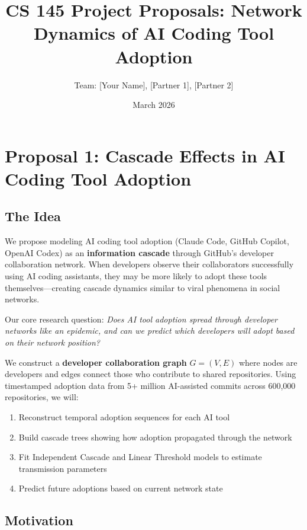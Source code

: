 \documentclass[11pt,letterpaper]{article}
\title{\vspace{-2em}\textbf{CS 145 Project Proposals: Network Dynamics of AI Coding Tool Adoption}\vspace{-1em}}
\author{Team: [Your Name], [Partner 1], [Partner 2]}
\date{March 2026}
\begin{document}
\maketitle
\thispagestyle{empty}

\section*{Proposal 1: Cascade Effects in AI Coding Tool Adoption}

\subsection*{The Idea}

We propose modeling AI coding tool adoption (Claude Code, GitHub Copilot, OpenAI Codex) as an \textbf{information cascade} through GitHub's developer collaboration network. When developers observe their collaborators successfully using AI coding assistants, they may be more likely to adopt these tools themselves---creating cascade dynamics similar to viral phenomena in social networks.

Our core research question: \textit{Does AI tool adoption spread through developer networks like an epidemic, and can we predict which developers will adopt based on their network position?}

We construct a \textbf{developer collaboration graph} $G = (V, E)$ where nodes are developers and edges connect those who contribute to shared repositories. Using timestamped adoption data from 5+ million AI-assisted commits across 600,000 repositories, we will:

\begin{enumerate}
    \item Reconstruct temporal adoption sequences for each AI tool
    \item Build cascade trees showing how adoption propagated through the network
    \item Fit Independent Cascade and Linear Threshold models to estimate transmission parameters
    \item Predict future adoptions based on current network state
\end{enumerate}

\subsection*{Motivation}
\end{document}
